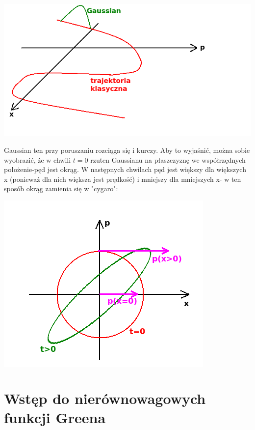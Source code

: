 \begin{center}
\includegraphics[scale=0.5]{obrazki/wykl_13_obrazek2.png}
\end{center}
Gaussian ten przy poruszaniu rozciąga się i kurczy. Aby to wyjaśnić, można sobie wyobrazić, że w chwili $t=0$ rzuten Gaussianu na płaszczyznę we współrzędnych położenie-pęd jest okrąg. W następnych chwilach pęd jest większy dla większych x (ponieważ dla nich większa jest prędkość) i mniejszy dla mniejszych x- w ten sposób okrąg zamienia się w "cygaro":
\begin{center}
\includegraphics[scale=0.5]{obrazki/wykl_13_obrazek3.png}
\end{center}

\section{Wstęp do nierównowagowych funkcji Greena}
